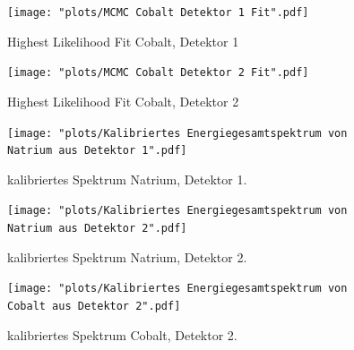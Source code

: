 \documentclass[%
aps,
onecolumn,
11pt,
tightenlines,
nofootinbib,
superscriptaddress,
floatfix,
prd,
]{revtex4-2}
\begin{document}
\begin{figure}
	\texttt{[image: "plots/MCMC Cobalt Detektor 1 Fit".pdf]}
	\caption{Highest Likelihood Fit Cobalt, Detektor 1}
	\label{fig:mcmcfitco1}
\end{figure}

\begin{figure}
		\texttt{[image: "plots/MCMC Cobalt Detektor 2 Fit".pdf]}
	\caption{Highest Likelihood Fit Cobalt, Detektor 2}
	\label{fig:mcmcfitco2}
\end{figure}

\begin{figure}		
	\texttt{[image: "plots/Kalibriertes Energiegesamtspektrum von Natrium aus Detektor 1".pdf]}
	\caption{kalibriertes Spektrum Natrium, Detektor 1.}
	\label{fig:calibratedsodium1}
\end{figure}



\begin{figure}		
	\texttt{[image: "plots/Kalibriertes Energiegesamtspektrum von Natrium aus Detektor 2".pdf]}
	\caption{kalibriertes Spektrum Natrium, Detektor 2.}
\end{figure}
\begin{figure}		
	\texttt{[image: "plots/Kalibriertes Energiegesamtspektrum von Cobalt aus Detektor 2".pdf]}
	\caption{kalibriertes Spektrum Cobalt, Detektor 2.}
	\label{fig:calibratedcobalt2}
\end{figure}
\end{document}

